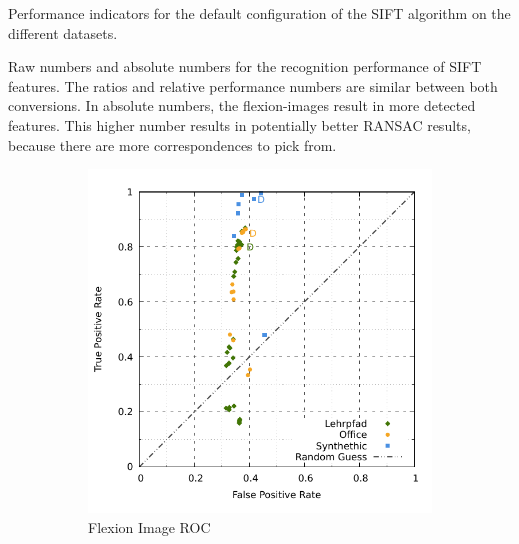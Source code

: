 \begin{table}[H]
    {\renewcommand{\arraystretch}{1.2}%
    \setlength{\tabcolsep}{0.3em}%

    }
    \caption{Performance indicators for the default configuration of the SIFT algorithm on the different datasets.}
\end{table}
Raw numbers and absolute numbers for the recognition performance of SIFT features.
The ratios and relative performance numbers are similar between both conversions.
In absolute numbers, the \glspl{flexion-image} result in more detected features.
This higher number results in potentially better RANSAC results, because there are more correspondences to pick from.
\begin{figure}[H]
\begin{subfigure}[t]{0.45\linewidth}
    \includegraphics[width=\linewidth]{chapter06/results/SIFT/flexion/roc.pdf}%
    \caption{Flexion Image ROC}
\end{subfigure}\quad
\begin{subfigure}[t]{0.45\linewidth}

\end{subfigure}
\end{figure}
